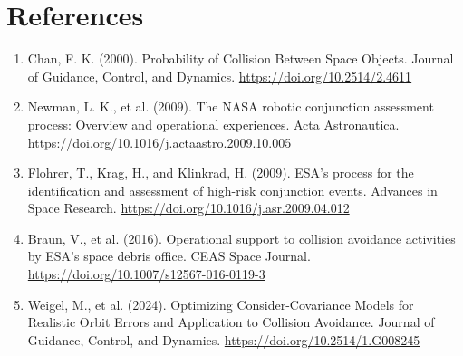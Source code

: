 \documentclass[11pt]{article}
\begin{document}
\section*{References}
\begin{enumerate}
    \item Chan, F. K. (2000). Probability of Collision Between Space Objects. Journal of Guidance, Control, and Dynamics. \url{https://doi.org/10.2514/2.4611}
    \item Newman, L. K., et al. (2009). The NASA robotic conjunction assessment process: Overview and operational experiences. Acta Astronautica. \url{https://doi.org/10.1016/j.actaastro.2009.10.005}
    \item Flohrer, T., Krag, H., and Klinkrad, H. (2009). ESA’s process for the identification and assessment of high-risk conjunction events. Advances in Space Research. \url{https://doi.org/10.1016/j.asr.2009.04.012}
    \item Braun, V., et al. (2016). Operational support to collision avoidance activities by ESA’s space debris office. CEAS Space Journal. \url{https://doi.org/10.1007/s12567-016-0119-3}
    \item Weigel, M., et al. (2024). Optimizing Consider-Covariance Models for Realistic Orbit Errors and Application to Collision Avoidance. Journal of Guidance, Control, and Dynamics. \url{https://doi.org/10.2514/1.G008245}
\end{enumerate}
\end{document}
